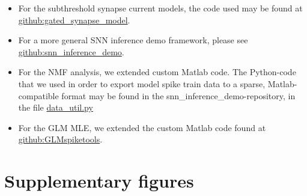 \documentclass[mphil,deptreport,ianc]{infthesis} %
\begin{document}
\begin{itemize}
    \item For the subthreshold synapse current models, the code used may be found at \href{https://github.com/williampeer/gated_synapse_model}{github:gated\_synapse\_model}.
    \item For a more general SNN inference demo framework, please see \href{https://github.com/williampeer/snn_inference_demo}{github:snn\_inference\_demo}.
    \item For the NMF analysis, we extended custom Matlab code. The Python-code that we used in order to export model spike train data to a sparse, Matlab-compatible format may be found in the snn\_inference\_demo-repository, in the file \href{https://github.com/williampeer/snn_inference_demo/blob/master/data_util.py}{data\_util.py}
    \item For the GLM MLE, we extended the custom Matlab code found at \href{https://github.com/pillowlab/GLMspiketools}{github:GLMspiketools}.
\end{itemize}



\chapter{Supplementary figures}
\label{appendix:supplementary_material}
\end{document}

